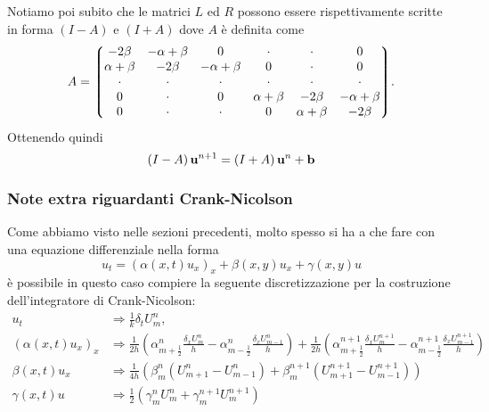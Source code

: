 \documentclass[10pt,a4paper]{article}
\begin{document}
Notiamo poi subito che le matrici $L$ ed $R$ possono essere rispettivamente scritte in forma $(I-A)$ e $(I+A)$ dove $A$ è definita come
\begin{equation}
	A = \mqty*(-2\beta & -\alpha + \beta & 0 & \cdot & \cdot & 0 \\ \alpha +\beta & -2\beta & -\alpha+\beta & 0 & \cdot & 0 \\ \cdot & \cdot & \cdot & \cdot & \cdot & \cdot \\ 0 & \cdot & 0 & \alpha +\beta & -2\beta & -\alpha+\beta \\ 0 & \cdot & \cdot & 0 & \alpha+\beta & -2\beta). 
\end{equation}
Ottenendo quindi
\begin{equation}
	\left(I-A\right)\vb{u}^{n+1} = \left(I+A\right)\vb{u}^n + \vb{b}
\end{equation}

\subsubsection{Note extra riguardanti Crank-Nicolson}
Come abbiamo visto nelle sezioni precedenti, molto spesso si ha a che fare con una equazione differenziale nella forma
\begin{equation}
	u_t = {(\alpha(x,t)u_x)}_x + \beta(x,y)u_x + \gamma(x,y)u
\end{equation}
è possibile in questo caso compiere la seguente discretizzazione per la costruzione dell'integratore di Crank-Nicolson:
\begin{align}
	u_t &\Rightarrow \frac{1}{k}\delta_t U_m^n,\\
	{(\alpha(x,t)u_x)}_x &\Rightarrow \frac{1}{2h}\left(\alpha_{m+\frac{1}{2}}^n \frac{\delta_x U_m^n}{h} - \alpha_{m-\frac{1}{2}}^n \frac{\delta_x U_{m-1}^n}{h}\right) + \frac{1}{2h}\left(\alpha_{m+\frac{1}{2}}^{n+1} \frac{\delta_x U_m^{n+1}}{h} - \alpha_{m-\frac{1}{2}}^{n+1} \frac{\delta_x U_{m-1}^{n+1}}{h}\right)\\
	\beta(x,t)u_x &\Rightarrow \frac{1}{4h}(\beta_m^n(U_{m+1}^n - U_{m-1}^n) + \beta_m^{n+1}(U_{m+1}^{n+1} - U_{m-1}^{n+1}))\\
	\gamma(x,t)u &\Rightarrow \frac{1}{2}(\gamma_m^n U_m^n + \gamma_m^{n+1} U_m^{n+1})
\end{align}

\end{document}
